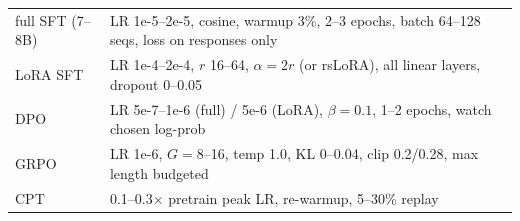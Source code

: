 \begin{mem}
\begin{tabularx}{\linewidth}{@{}lL@{}}
\toprule
full SFT (7--8B) & LR 1e-5--2e-5, cosine, warmup 3\%, 2--3 epochs, batch 64--128 seqs, loss on responses only\\
LoRA SFT & LR 1e-4--2e-4, $r$ 16--64, $\alpha=2r$ (or rsLoRA), all linear layers, dropout 0--0.05\\
DPO & LR 5e-7--1e-6 (full) / 5e-6 (LoRA), $\beta=0.1$, 1--2 epochs, watch chosen log-prob\\
GRPO & LR 1e-6, $G=8$--16, temp 1.0, KL 0--0.04, clip 0.2/0.28, max length budgeted\\
CPT & 0.1--0.3$\times$ pretrain peak LR, re-warmup, 5--30\% replay\\\bottomrule
\end{tabularx}
\end{mem}
